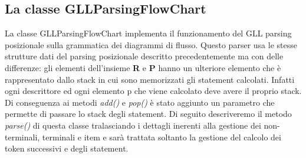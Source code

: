\subsection{La classe GLLParsingFlowChart}
La classe GLLParsingFlowChart implementa il funzionamento del GLL parsing posizionale sulla grammatica dei diagrammi di flusso. Questo parser usa le stesse strutture dati del parsing posizionale descritto precedentemente ma con delle differenze: gli elementi dell'insieme \textbf{R} e \textbf{P} hanno un ulteriore elemento che è rappresentato dallo stack in cui sono memorizzati gli statement calcolati. Infatti ogni descrittore ed ogni elemento p che viene calcolato deve avere il proprio stack. Di conseguenza ai metodi \textit{add()} e \textit{pop()} è stato aggiunto un parametro che permette di passare lo stack degli statement. Di seguito descriveremo il metodo \textit{parse()} di questa classe tralasciando i dettagli inerenti alla gestione dei non-terminali, terminali e item e sarà trattata soltanto la gestione del calcolo dei token successivi e degli statement.
